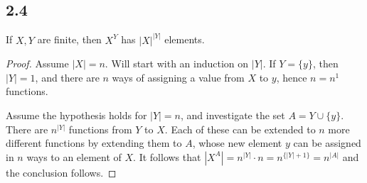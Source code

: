 \subsection*{2.4} If $X,Y$ are finite, then $X^Y$ has $|X|^{|Y|}$ elements.

\begin{proof}
Assume $|X|=n$. Will start with an induction on $|Y|$. If $Y=\{y\}$, then $|Y|=1$, and there are $n$ ways of assigning a value from $X$ to $y$, hence $n = n^1$ functions.

Assume the hypothesis holds for $|Y|=n$, and investigate the set $A=Y \cup \{y\}$. There are $n^{|Y|}$ functions from $Y$ to $X$. Each of these can be extended to $n$ more different functions by extending them to $A$, whose new element $y$ can be assigned in $n$ ways to an element of $X$. It follows that $|X^A| = n^{|Y|} \cdot n = n^{\{|Y|+1\}} = n^{|A|}$ and the conclusion follows.
\end{proof}

